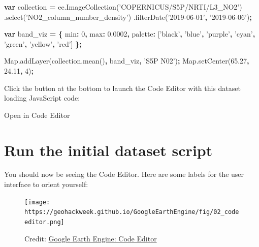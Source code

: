 \documentclass[]{book}
\newenvironment{Shaded}{\begin{snugshade}}{\end{snugshade}}
\newcommand{\AttributeTok}[1]{\textcolor[rgb]{0.77,0.63,0.00}{#1}}
\newcommand{\DataTypeTok}[1]{\textcolor[rgb]{0.13,0.29,0.53}{#1}}
\newcommand{\DecValTok}[1]{\textcolor[rgb]{0.00,0.00,0.81}{#1}}
\newcommand{\FloatTok}[1]{\textcolor[rgb]{0.00,0.00,0.81}{#1}}
\newcommand{\KeywordTok}[1]{\textcolor[rgb]{0.13,0.29,0.53}{\textbf{#1}}}
\newcommand{\NormalTok}[1]{#1}
\newcommand{\OperatorTok}[1]{\textcolor[rgb]{0.81,0.36,0.00}{\textbf{#1}}}
\newcommand{\StringTok}[1]{\textcolor[rgb]{0.31,0.60,0.02}{#1}}
\newcommand{\VariableTok}[1]{\textcolor[rgb]{0.00,0.00,0.00}{#1}}
\begin{document}
\begin{Shaded}
\begin{Highlighting}[]
\KeywordTok{var}\NormalTok{ collection }\OperatorTok{=} \VariableTok{ee}\NormalTok{.}\AttributeTok{ImageCollection}\NormalTok{(}\StringTok{'COPERNICUS/S5P/NRTI/L3_NO2'}\NormalTok{)}
\NormalTok{  .}\AttributeTok{select}\NormalTok{(}\StringTok{'NO2_column_number_density'}\NormalTok{)}
\NormalTok{  .}\AttributeTok{filterDate}\NormalTok{(}\StringTok{'2019-06-01'}\OperatorTok{,} \StringTok{'2019-06-06'}\NormalTok{)}\OperatorTok{;}

\KeywordTok{var}\NormalTok{ band_viz }\OperatorTok{=} \OperatorTok{\{}
  \DataTypeTok{min}\OperatorTok{:} \DecValTok{0}\OperatorTok{,}
  \DataTypeTok{max}\OperatorTok{:} \FloatTok{0.0002}\OperatorTok{,}
  \DataTypeTok{palette}\OperatorTok{:}\NormalTok{ [}\StringTok{'black'}\OperatorTok{,} \StringTok{'blue'}\OperatorTok{,} \StringTok{'purple'}\OperatorTok{,} \StringTok{'cyan'}\OperatorTok{,} \StringTok{'green'}\OperatorTok{,} \StringTok{'yellow'}\OperatorTok{,} \StringTok{'red'}\NormalTok{]}
\OperatorTok{\};}

\VariableTok{Map}\NormalTok{.}\AttributeTok{addLayer}\NormalTok{(}\VariableTok{collection}\NormalTok{.}\AttributeTok{mean}\NormalTok{()}\OperatorTok{,}\NormalTok{ band_viz}\OperatorTok{,} \StringTok{'S5P N02'}\NormalTok{)}\OperatorTok{;}
\VariableTok{Map}\NormalTok{.}\AttributeTok{setCenter}\NormalTok{(}\FloatTok{65.27}\OperatorTok{,} \FloatTok{24.11}\OperatorTok{,} \DecValTok{4}\NormalTok{)}\OperatorTok{;}
\end{Highlighting}
\end{Shaded}

Click the button at the bottom to launch the Code Editor with this dataset loading JavaScript code:

Open in Code Editor

\hypertarget{run-the-initial-dataset-script}{%
\section{Run the initial dataset script}\label{run-the-initial-dataset-script}}

You should now be seeing the Code Editor. Here are some labels for the user interface to orient yourself:

\begin{figure}
\centering
\texttt{[image: https://geohackweek.github.io/GoogleEarthEngine/fig/02\_codeeditor.png]}
\caption{Credit: \href{https://geohackweek.github.io/GoogleEarthEngine/02-code-editor/}{Google Earth Engine: Code Editor}}
\end{figure}
\end{document}
